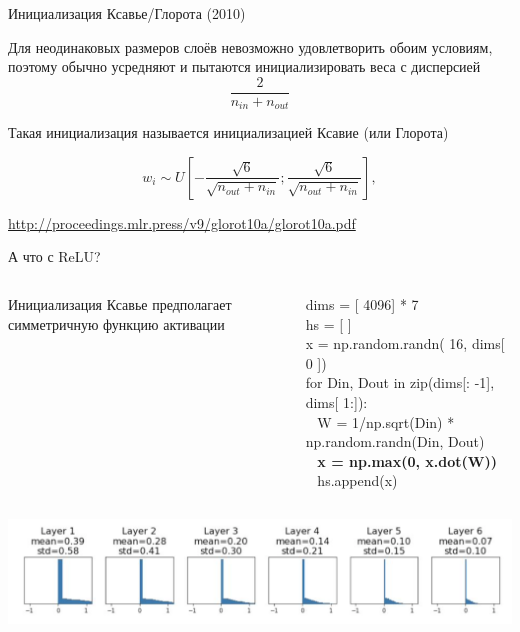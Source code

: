 \documentclass[notes,12pt, aspectratio=169]{beamer}
\newenvironment{wideitemize}{\itemize\addtolength{\itemsep}{10pt}}{\enditemize}
\begin{document}
\begin{frame}{Инициализация Ксавье/Глорота (2010)}
	\begin{wideitemize}
		\item Для неодинаковых размеров слоёв невозможно удовлетворить обоим условиям, поэтому обычно усредняют и пытаются инициализировать веса с дисперсией $$\frac{2}{n_{in} + n_{out}}$$
		
		\item Такая инициализация называется \alert{инициализацией Ксавие (или Глорота)}
	
		$$ w_i \sim U \left[ - \frac{\sqrt{6}}{\sqrt{n_{out} + n_{in}}};  \frac{\sqrt{6}}{\sqrt{n_{out} + n_{in}}}  \right],$$
		
	\end{wideitemize}
	\vfill %
	\footnotesize
	{\color{blue} \url{http://proceedings.mlr.press/v9/glorot10a/glorot10a.pdf}}
\end{frame}


\begin{frame}{А что с ReLU?}
	\begin{columns}
	\begin{column}{.3\textwidth}	
		Инициализация Ксавье предполагает симметричную функцию активации
	\end{column}
	\begin{column}{.7\textwidth}
		dims = [{\color{green} 4096}] *  {\color{green} 7} \\
		hs = [ ] \\
		x = np.random.randn(  {\color{green} 16}, dims[  {\color{green} 0} ]) \\
		{\color{green} for} Din, Dout {\color{green} in zip}(dims[:  {\color{green} -1}], dims[ {\color{green} 1}:]): \\  
		\mbox{ } \hspace{5mm} W =  1/np.sqrt(Din) * np.random.randn(Din, Dout) \\
		\mbox{ } \hspace{5mm} {\color{red} \textbf {x = np.max(0, x.dot(W))} } \\
		\mbox{ } \hspace{5mm} hs.append(x)
	\end{column}
\end{columns}
\begin{center}
	\includegraphics[width=.99\linewidth]{relu_init_x.png}
\end{center}
\end{frame}
\end{document}
